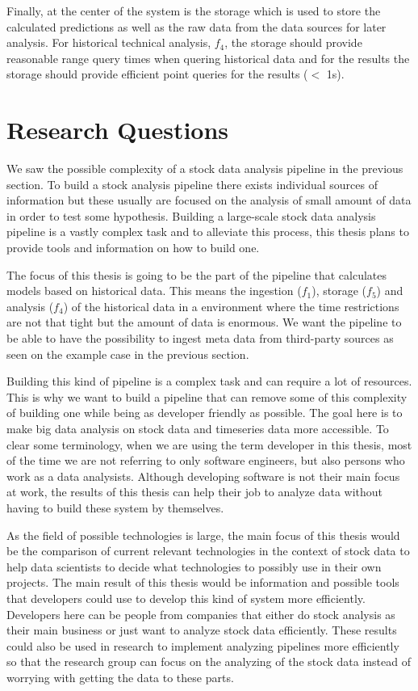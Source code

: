 Finally, at the center of the system is the storage which is used to store the calculated predictions as well as the raw data from the data sources for later analysis.
For historical technical analysis, $f_4$, the storage should provide reasonable range query times when quering historical data and for the results the storage should provide efficient point queries for the results ($<$ 1s).

\section{Research Questions}

We saw the possible complexity of a stock data analysis pipeline in the previous section.
To build a stock analysis pipeline there exists individual sources of information but these usually are focused on the analysis of small amount of data in order to test some hypothesis.
Building a large-scale stock data analysis pipeline is a vastly complex task and to alleviate this process, this thesis plans to provide tools and information on how to build one.

The focus of this thesis is going to be the part of the pipeline that calculates models based on historical data.
This means the ingestion ($f_1$), storage ($f_5$) and analysis ($f_4$) of the historical data in a environment where the time restrictions are not that tight but the amount of data is enormous.
We want the pipeline to be able to have the possibility to ingest meta data from third-party sources as seen on the example case in the previous section.

Building this kind of pipeline is a complex task and can require a lot of resources.
This is why we want to build a pipeline that can remove some of this complexity of building one while being as developer friendly as possible.
The goal here is to make big data analysis on stock data and timeseries data more accessible.
To clear some terminology, when we are using the term developer in this thesis, most of the time we are not referring to only software engineers, but also persons who work as a data analysists.
Although developing software is not their main focus at work, the results of this thesis can help their job to analyze data without having to build these system by themselves.

As the field of possible technologies is large, the main focus of this thesis would be the comparison of current relevant technologies in the context of stock data to help data scientists to decide what technologies to possibly use in their own projects.
The main result of this thesis would be information and possible tools that developers could use to develop this kind of system more efficiently.
Developers here can be people from companies that either do stock analysis as their main business or just want to analyze stock data efficiently.
These results could also be used in research to implement analyzing pipelines more efficiently so that the research group can focus on the analyzing of the stock data instead of worrying with getting the data to these parts.

